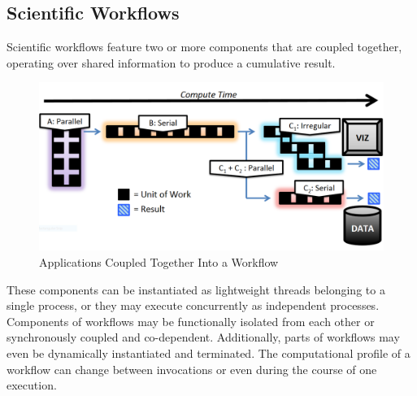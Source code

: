 \subsection{Scientific Workflows} %
%
Scientific workflows feature two or more components that are coupled
together, operating over shared information to produce a cumulative
result.
%
\begin{figure}[h]
\centering
\includegraphics[width=\columnwidth]{images/workflow_example.png}
\caption{Applications Coupled Together Into a Workflow}
\label{fig_workflow_example}
\end{figure}
%
These components can be instantiated as lightweight threads belonging
to a single process, or they may execute concurrently as independent
processes.
%
Components of workflows may be functionally isolated from each
other or synchronously coupled and co-dependent.
%
Additionally, parts of workflows may even be dynamically instantiated and
terminated.
%
The computational profile of a workflow can change between invocations
or even during the course of one execution.
%
%
\par
%
%
%
%
%
